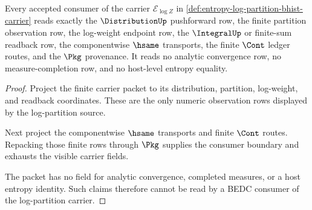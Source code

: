 \begin{theorem}
\label{thm:entropy-log-partition-consumer-exhaustion}
Every accepted consumer of the carrier
$\mathcal E_{\log Z}$ in
\autoref{def:entropy-log-partition-bhist-carrier} reads exactly the
$\DistributionUp$ pushforward row, the finite partition observation row, the
log-weight endpoint row, the $\IntegralUp$ or finite-sum readback row, the
componentwise $\hsame$ transports, the finite $\Cont$ ledger routes, and the
$\Pkg$ provenance. It reads no analytic convergence row, no measure-completion
row, and no host-level entropy equality.
\end{theorem}
\begin{proof}
Project the finite carrier packet to its distribution, partition, log-weight,
and readback coordinates. These are the only numeric observation rows displayed
by the log-partition source.

Next project the componentwise $\hsame$ transports and finite $\Cont$ routes.
Repacking those finite rows through $\Pkg$ supplies the consumer boundary and
exhausts the visible carrier fields.

The packet has no field for analytic convergence, completed measures, or a
host entropy identity. Such claims therefore cannot be read by a BEDC consumer
of the log-partition carrier.
\end{proof}

